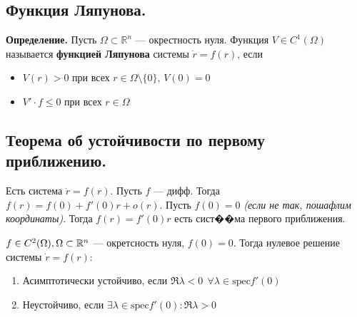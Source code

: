 \subsection*{Функция Ляпунова.}

\noindent \textbf{Определение.} Пусть $\Omega \subset \mathbb{R}^n$ --- окрестность нуля. Функция $V \in C^1(\Omega)$ называется \textbf{функцией Ляпунова} системы $\dot{r} = f(r)$, если
\begin{itemize}
    \item $V(r) > 0$ при всех $r \in \Omega \setminus \{0\}$, $V(0) = 0$
    \item $V' \cdot f \le 0$ при всех $r \in \Omega$
\end{itemize}

\subsection*{Теорема об устойчивости по первому приближению.}

Есть система \(\dot{r} = f(r)\). Пусть \(f\) --- дифф. Тогда \(f(r) = f(0) + f'(0)r + o(r)\). Пусть \(f(0) = 0\) \textit{(если не так, пошафлим координаты)}. Тогда \(f(r) = f'(0)r\) есть сист��ма первого приближения.

\begin{theorem}
    \(f\in C^2(\Omega), \Omega\subset \mathbb{R}^n\) --- окретсность нуля, \(f(0) = 0\). Тогда нулевое решение системы \(\dot{r} = f(r)\):
    \begin{enumerate}
        \item Асимптотически устойчиво, если \(\Re \lambda < 0 \ \ \forall \lambda \in \text{spec} f'(0)\)
        \item Неустойчиво, если \(\exists \lambda\in \text{spec} f'(0) : \Re \lambda > 0\)
    \end{enumerate}
\end{theorem}



